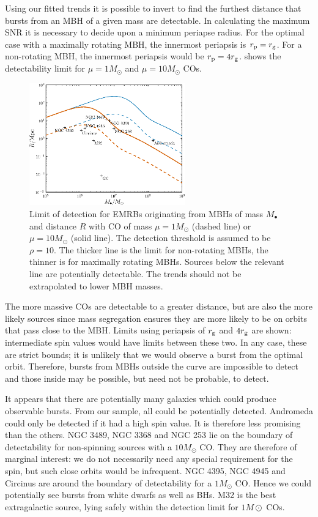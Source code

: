 Using our fitted trends it is possible to invert  to find the furthest distance that bursts from an MBH of a given mass are detectable. In calculating the maximum SNR it is necessary to decide upon a minimum periapse radius. For the optimal case with a maximally rotating MBH, the innermost periapsis is $r_\mathrm{p} = r_\mathrm{g}$. For a non-rotating MBH, the innermost periapsis would be $r_\mathrm{p} = 4r_\mathrm{g}$.  shows the detectability limit for $\mu = 1 M_\odot$ and $\mu = 10 M_\odot$ COs.
\begin{figure}[!htp]
\begin{center}
 \includegraphics[width=0.6\textwidth]{./images/Fig_M_R_detect_1}
 \caption{Limit of detection for EMRBs originating from MBHs of mass $M_\bullet$ and distance $R$ with CO of mass $\mu = 1 M_\odot$ (dashed line) or $\mu = 10 M_\odot$ (solid line). The detection threshold is assumed to be $\rho = 10$. The thicker line is the limit for non-rotating MBHs, the thinner is for maximally rotating MBHs. Sources below the relevant line are potentially detectable. The trends should not be extrapolated to lower MBH masses.\label{fig:detect}}
   \end{center}
\end{figure}
The more massive COs are detectable to a greater distance, but are also the more likely sources since mass segregation ensures they are more likely to be on orbits that pass close to the MBH. Limits using periapsis of $r_\mathrm{g}$ and $4r_\mathrm{g}$ are shown: intermediate spin values would have limits between these two. In any case, these are strict bounds; it is unlikely that we would observe a burst from the optimal orbit. Therefore, bursts from MBHs outside the curve are impossible to detect and those inside may be possible, but need not be probable, to detect.

It appears that there are potentially many galaxies which could produce observable bursts. From our sample, all could be potentially detected. Andromeda could only be detected if it had a high spin value. It is therefore less promising than the others. NGC 3489, NGC 3368 and NGC 253 lie on the boundary of detectability for non-spinning sources with a $10 M_\odot$ CO. They are therefore of marginal interest: we do not necessarily need any special requirement for the spin, but such close orbits would be infrequent. NGC 4395, NGC 4945 and Circinus are around the boundary of detectability for a $1 M_\odot$ CO. Hence we could potentially see bursts from white dwarfs as well as BHs. M32 is the best extragalactic source, lying safely within the detection limit for $1 M\odot$ COs.

